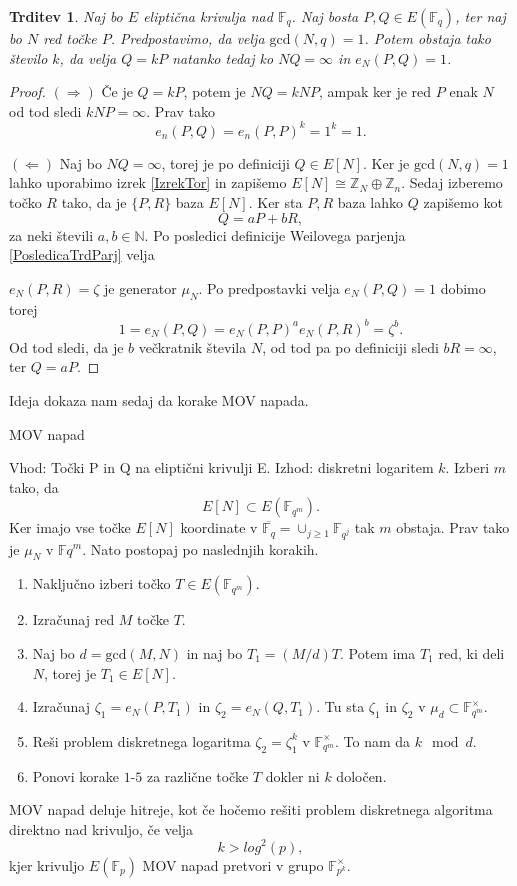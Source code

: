 \documentclass[12pt,a4paper,twoside]{article}
\theoremstyle{definition} %
\theoremstyle{plain} %
\newtheorem{trditev}[definicija]{Trditev}
\numberwithin{equation}{section}  %
\newcommand{\N}{\mathbb N}
\newcommand{\Z}{\mathbb Z}
\newcommand{\F}{\mathbb F}
\newcommand{\Fq}[1]{{\mathbb{F}_{#1}}}
\newcommand{\E}[1]{E({#1})}
\begin{document}
\begin{trditev}
\label{trd:5.1}
Naj bo $E$ eliptična krivulja nad $\F_{q}$. Naj bosta $P,Q \in E(\F_{q})$, ter naj bo $N$ red točke $P$. Predpostavimo, da velja $\text{gcd}(N,q)=1$. Potem obstaja tako število $k$, da velja $Q = kP$ natanko tedaj ko $NQ = \infty$ in $e_N(P,Q)=1$.
\end{trditev}

\begin{proof}
$(\Rightarrow)$ Če je $Q = kP$, potem je $NQ = kNP$, ampak ker je red $P$ enak $N$ od tod sledi $kNP = \infty$. Prav tako
$$e_n(P,Q) = e_n(P,P)^k = 1^k = 1.$$

$(\Leftarrow)$ Naj bo $NQ = \infty$, torej je po definiciji $Q \in E[N]$. Ker je $\text{gcd}(N,q) = 1$ lahko uporabimo izrek \ref{IzrekTor} in zapišemo 
$E[N] \cong \Z_N \oplus \Z_n$. Sedaj izberemo točko $R$ tako, da je $\{P,R \}$ baza $E[N]$. Ker sta $P,R$ baza  lahko $Q$ zapišemo kot
$$Q = aP+bR,$$
za neki števili $a,b \in \N$. Po posledici definicije Weilovega parjenja \ref{PosledicaTrdParj} velja 

\noindent $e_N(P,R)=\zeta$ je generator $\mu_N$.
Po predpostavki velja $e_N(P,Q) = 1$ dobimo torej
$$1 = e_N(P,Q) = e_N(P,P)^ae_N(P,R)^b = \zeta^b.$$
Od tod sledi, da je $b$ večkratnik števila $N$, od tod pa po definiciji sledi $bR = \infty$, ter $Q = aP$.
\end{proof}

Ideja dokaza nam sedaj da korake MOV napada.

\begin{algorithm}[H]
\caption[MOV]{MOV napad}
\label{alg:MOV}
Vhod: Točki P in Q na eliptični krivulji E.\newline
Izhod: diskretni logaritem $k$.\newline
Izberi $m$ tako, da $$E[N] \subset \E{\Fq{q^m}}.$$
Ker imajo vse točke $E[N]$ koordinate v $\overline{\Fq{q}} = \cup_{j\geq 1}\F_{q^j}$ tak $m$ obstaja. Prav tako je $\mu_N$ v $\F{q^m}$.
Nato postopaj po naslednjih korakih.
\begin{enumerate}
\item Naključno izberi točko $T \in \E{\Fq{q^m}}$.
\item Izračunaj red $M$ točke $T$.
\item Naj bo $d = \text{gcd}(M,N)$ in naj bo $T_1 = (M/d)T$. Potem ima $T_1$ red, ki deli $N$, torej je $T_1 \in E[N]$.
\item Izračunaj $\zeta_1 = e_N(P,T_1)$ in $\zeta_2 = e_N(Q,T_1)$. Tu sta $\zeta_1$ in $\zeta_2$ v $\mu_d \subset \F_{q^m}^\times$.
\item Reši problem diskretnega logaritma $\zeta_2 = \zeta_1^k$ v $\F_{q^m}^\times$. To nam da $k \mod d$.
\item Ponovi korake $1$-$5$ za različne točke $T$ dokler ni $k$ določen.
\end{enumerate}

\end{algorithm}
MOV napad deluje hitreje, kot če hočemo rešiti problem diskretnega algoritma direktno nad krivuljo, če velja 
$$k > log^2(p),$$
kjer krivuljo $E(\F_p)$ MOV napad pretvori v grupo $\F^{\times}_{p^k}$.
\end{document}
